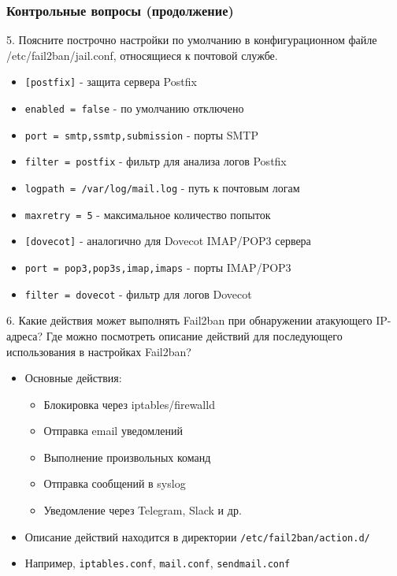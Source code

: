 \begin{frame}
\frametitle{Контрольные вопросы (продолжение)}
5. Поясните построчно настройки по умолчанию в конфигурационном файле /etc/fail2ban/jail.conf, относящиеся к почтовой службе.
\begin{itemize}
    \item \texttt{[postfix]} - защита сервера Postfix
    \item \texttt{enabled = false} - по умолчанию отключено
    \item \texttt{port = smtp,ssmtp,submission} - порты SMTP
    \item \texttt{filter = postfix} - фильтр для анализа логов Postfix
    \item \texttt{logpath = /var/log/mail.log} - путь к почтовым логам
    \item \texttt{maxretry = 5} - максимальное количество попыток
    \item \texttt{[dovecot]} - аналогично для Dovecot IMAP/POP3 сервера
    \item \texttt{port = pop3,pop3s,imap,imaps} - порты IMAP/POP3
    \item \texttt{filter = dovecot} - фильтр для логов Dovecot
\end{itemize}
\end{frame}

\begin{frame}
6. Какие действия может выполнять Fail2ban при обнаружении атакующего IP-адреса? Где можно посмотреть описание действий для последующего использования в настройках Fail2ban?
\begin{itemize}
    \item Основные действия:
    \begin{itemize}
        \item Блокировка через iptables/firewalld
        \item Отправка email уведомлений
        \item Выполнение произвольных команд
        \item Отправка сообщений в syslog
        \item Уведомление через Telegram, Slack и др.
    \end{itemize}
    \item Описание действий находится в директории \texttt{/etc/fail2ban/action.d/}
    \item Например, \texttt{iptables.conf}, \texttt{mail.conf}, \texttt{sendmail.conf}
\end{itemize}
\end{frame}

